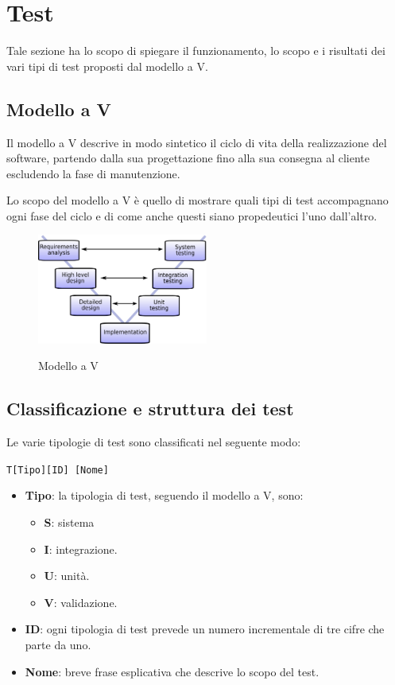 \section{Test}

Tale sezione ha lo scopo di spiegare il funzionamento, lo scopo e i risultati dei vari tipi di test proposti dal modello a V.

\subsection{Modello a V}
Il modello a V descrive in modo sintetico il ciclo di vita della realizzazione del software, partendo dalla sua progettazione fino alla sua consegna al cliente escludendo la fase di manutenzione.

Lo scopo del modello a V è quello di mostrare quali tipi di test accompagnano ogni fase del ciclo e di come anche questi siano propedeutici l'uno dall'altro.

\begin{figure}[H]
	\centering
	\includegraphics[width=0.5\textwidth]{img/V-model.png}
	\label{img:vmodel}
	\caption{Modello a V\protect\footnotemark}
\end{figure}


\subsection{Classificazione e struttura dei test}
Le varie tipologie di test sono classificati nel seguente modo:

\begin{center}
	\texttt{T[Tipo][ID] [Nome]}
\end{center}

\begin{itemize}
	\item \textbf{Tipo}: la tipologia di test, seguendo il modello a V, sono:
	\begin{itemize}
		\item \textbf{S}: sistema
		\item \textbf{I}: integrazione.
		\item \textbf{U}: unità.
		\item \textbf{V}: validazione. %
	\end{itemize}
	\item \textbf{ID}: ogni tipologia di test prevede un numero incrementale di tre cifre che parte da uno.
	\item \textbf{Nome}: breve frase esplicativa che descrive lo scopo del test.
\end{itemize}

